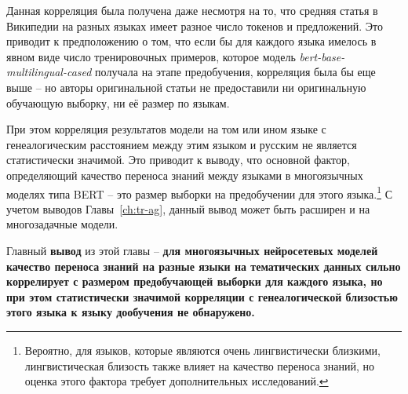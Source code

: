 Данная корреляция была получена даже несмотря на то, что средняя статья в Википедии на разных языках имеет разное число токенов и предложений. Это приводит к предположению о том, что если бы для каждого языка имелось в явном виде число тренировочных примеров, которое модель \textit{bert-base-multilingual-cased} получала на этапе предобучения, корреляция была бы еще выше -- но авторы оригинальной статьи не предоставили ни оригинальную обучающую выборку, ни её размер по языкам. 

При этом корреляция результатов модели на том или ином языке с генеалогическим расстоянием между этим языком и русским не является статистически значимой. Это приводит к выводу, что основной фактор, определяющий качество переноса знаний между языками в многоязычных моделях типа BERT -- это размер выборки на предобучении для этого языка.\footnote{Вероятно, для языков, которые являются очень лингвистически близкими, лингвистическая близость также влияет на качество переноса знаний, но оценка этого фактора требует дополнительных исследований.} С учетом выводов Главы~\ref{ch:tr-ag}, данный вывод может быть расширен и на многозадачные модели.

Главный \textbf{вывод} из этой главы -- \textbf{для многоязычных нейросетевых моделей качество переноса знаний на разные языки на тематических данных сильно коррелирует с размером предобучающей выборки для каждого языка, но при этом статистически значимой корреляции с генеалогической близостью этого языка к языку дообучения не обнаружено.}


 
